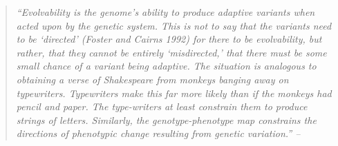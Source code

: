 \begin{refsection}
\begin{quote}
\textit{
``Evolvability is the genome's ability to produce adaptive variants when
acted upon by the genetic system. This is not to say that the variants
need to be `directed' (Foster and Cairns 1992) for there to be
evolvability, but rather, that they cannot be entirely `misdirected,'
that there must be some small chance of a variant being adaptive. The
situation is analogous to obtaining a verse of Shakespeare from monkeys
banging away on typewriters. Typewriters make this far more likely than
if the monkeys had pencil and paper. The type-writers at least constrain
them to produce strings of letters. Similarly, the genotype-phenotype
map constrains the directions of phenotypic change resulting from
genetic variation.'' -- \textcite{Wagner1996-ui}}
\end{quote}


\end{refsection}
